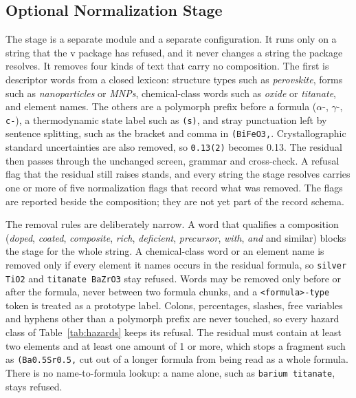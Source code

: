 \documentclass[10pt,journal]{IEEEtran}
\begin{document}
\subsection{Optional Normalization Stage}
\label{sec:stage}
The stage is a separate module and a separate configuration. It runs only on a string that the v\ParserVersion{} package has refused, and it never changes a string the package resolves. It removes four kinds of text that carry no composition. The first is descriptor words from a closed lexicon: structure types such as \emph{perovskite}, forms such as \emph{nanoparticles} or \emph{MNPs}, chemical-class words such as \emph{oxide} or \emph{titanate}, and element names. The others are a polymorph prefix before a formula ($\alpha$-, $\gamma$-, \texttt{c-}), a thermodynamic state label such as \texttt{(s)}, and stray punctuation left by sentence splitting, such as the bracket and comma in \texttt{(BiFeO3,}. Crystallographic standard uncertainties are also removed, so \texttt{0.13(2)} becomes 0.13. The residual then passes through the unchanged screen, grammar and cross-check. A refusal flag that the residual still raises stands, and every string the stage resolves carries one or more of five normalization flags that record what was removed. The flags are reported beside the composition; they are not yet part of the record schema.

The removal rules are deliberately narrow. A word that qualifies a composition (\emph{doped}, \emph{coated}, \emph{composite}, \emph{rich}, \emph{deficient}, \emph{precursor}, \emph{with}, \emph{and} and similar) blocks the stage for the whole string. A chemical-class word or an element name is removed only if every element it names occurs in the residual formula, so \texttt{silver TiO2} and \texttt{titanate BaZrO3} stay refused. Words may be removed only before or after the formula, never between two formula chunks, and a \texttt{<formula>-type} token is treated as a prototype label. Colons, percentages, slashes, free variables and hyphens other than a polymorph prefix are never touched, so every hazard class of Table~\ref{tab:hazards} keeps its refusal. The residual must contain at least two elements and at least one amount of 1 or more, which stops a fragment such as \texttt{(Ba0.5Sr0.5,} cut out of a longer formula from being read as a whole formula. There is no name-to-formula lookup: a name alone, such as \texttt{barium titanate}, stays refused.
\end{document}
